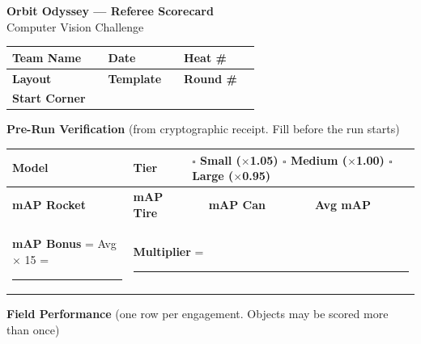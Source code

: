 \documentclass[a4paper]{article}
\begin{document}
\begin{center}
{\Large \textbf{Orbit Odyssey --- Referee Scorecard}} \\[2pt]
{\small Computer Vision Challenge}
\end{center}

\vspace{0.4em}

{\small
\begin{tabular}{|p{2.2cm}|p{4.8cm}|p{2.2cm}|p{2.5cm}|p{1.5cm}|p{3cm}|}
\hline
\textbf{Team Name} & \rule{0pt}{14pt} & \textbf{Date} & & \textbf{Heat \#} & \\
\hline
\textbf{Layout} & & \textbf{Template} & & \textbf{Round \#} & \\
\hline
\textbf{Start Corner} & & & & & \\
\hline
\end{tabular}
}

\vspace{0.5em}

{\small \textbf{Pre-Run Verification} {\scriptsize (from cryptographic receipt. Fill before the run starts)}}

\vspace{0.2em}

{\small
\begin{tabular}{|p{2.2cm}|p{3.5cm}|p{1cm}|p{1.2cm}|p{1cm}|p{1.2cm}|p{1.5cm}|p{1.2cm}|}
\hline
\textbf{Model} & \rule{0pt}{14pt} & \textbf{Tier} & \multicolumn{5}{l|}{$\square$ Small ($\times$1.05) \quad $\square$ Medium ($\times$1.00) \quad $\square$ Large ($\times$0.95)} \\
\hline
\textbf{mAP Rocket} & & \textbf{mAP Tire} & & \textbf{mAP Can} & & \textbf{Avg mAP} & \\
\hline
\multicolumn{2}{|l|}{\textbf{mAP Bonus} = Avg $\times$ 15 = \rule{1.5cm}{0.4pt}} & \multicolumn{6}{l|}{\textbf{Multiplier} = \rule{1.5cm}{0.4pt}} \\
\hline
\end{tabular}
}

\vspace{0.5em}

{\small \textbf{Field Performance} {\scriptsize (one row per engagement. Objects may be scored more than once)}}

\vspace{0.2em}
\end{document}
